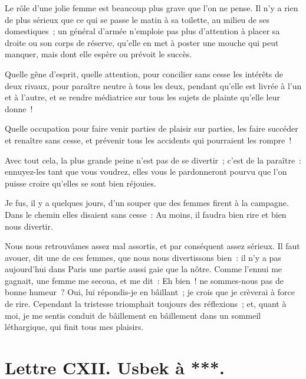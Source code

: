 \documentclass[french,twoside]{book} %
\newcommand{\dateline}[1]{\medskip{\RaggedLeft{#1}\par}\bigskip}
\begin{document}
\noindent Le rôle d’une jolie femme est beaucoup plus grave que l’on ne pense. Il n’y a rien de plus sérieux que ce qui se passe le matin à sa toilette, au milieu de ses domestiques ; un général d’armée n’emploie pas plus d’attention à placer sa droite ou son corps de réserve, qu’elle en met à poster une mouche qui peut manquer, mais dont elle espère ou prévoit le succès.\par
Quelle gêne d’esprit, quelle attention, pour concilier sans cesse les intérêts de deux rivaux, pour paraître neutre à tous les deux, pendant qu’elle est livrée à l’un et à l’autre, et se rendre médiatrice sur tous les sujets de plainte qu’elle leur donne !\par
Quelle occupation pour faire venir parties de plaisir sur parties, les faire succéder et renaître sans cesse, et prévenir tous les accidents qui pourraient les rompre !\par
Avec tout cela, la plus grande peine n’est pas de se divertir ; c’est de la paraître : ennuyez-les tant que vous voudrez, elles vous le pardonneront pourvu que l’on puisse croire qu’elles se sont bien réjouies.\par
Je fus, il y a quelques jours, d’un souper que des femmes firent à la campagne. Dans le chemin elles disaient sans cesse : Au moins, il faudra bien rire et bien nous divertir.\par
Nous nous retrouvâmes assez mal assortis, et par conséquent assez sérieux. Il faut avouer, dit une de ces femmes, que nous nous divertissons bien : il n’y a pas aujourd’hui dans Paris une partie aussi gaie que la nôtre. Comme l’ennui me gagnait, une femme me secoua, et me dit : Eh bien ! ne sommes-nous pas de bonne humeur ? Oui, lui répondis-je en bâillant ; je crois que je crèverai à force de rire. Cependant la tristesse triomphait toujours des réflexions ; et, quant à moi, je me sentis conduit de bâillement en bâillement dans un sommeil léthargique, qui finit tous mes plaisirs.\par

\dateline{De Paris, le 11 de la lune de Maharram, 1718.}
\section[{Lettre CXII. Usbek à ***.}]{Lettre CXII. Usbek à ***.}\renewcommand{\leftmark}{Lettre CXII. Usbek à ***.}
\end{document}
